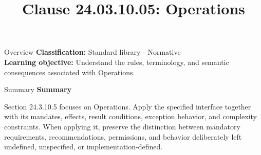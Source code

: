 \documentclass[10pt,letterpaper]{article}
\title{Clause 24.03.10.05: Operations}
\author{}
\date{}
\begin{document}
\maketitle
\begin{CornellOverviewBox}{Overview}
\textbf{Classification:} Standard library - Normative\\[2pt]
\textbf{Learning objective:} Understand the rules, terminology, and semantic consequences associated with Operations.
\end{CornellOverviewBox}\begin{CornellSummaryBox}{Summary}
{\sffamily\bfseries\color{Accent} Summary}\par\vspace{3pt}Section 24.3.10.5 focuses on Operations. Apply the specified interface together with its mandates, effects, result conditions, exception behavior, and complexity constraints. When applying it, preserve the distinction between mandatory requirements, recommendations, permissions, and behavior deliberately left undefined, unspecified, or implementation-defined.
\end{CornellSummaryBox}
\end{document}

